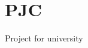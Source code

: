 \chapter{PJC}
\hypertarget{md__r_e_a_d_m_e}{}\label{md__r_e_a_d_m_e}
\label{md__r_e_a_d_m_e_autotoc_md0}%
%
Project for university 